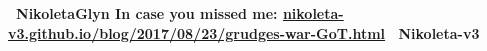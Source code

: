 \documentclass[usenames,dvipsnames,t]{beamer}
\begin{document}



\begin{columns}
    \begin{column}{.8\linewidth}
        \hspace{1cm}
     \textbf{ \faTwitter \ NikoletaGlyn \hspace{2cm} In case you missed me: \url{nikoleta-v3.github.io/blog/2017/08/23/grudges-war-GoT.html} \hspace{2cm} \faGithub \ Nikoleta-v3}
     \end{column}
\end{columns}
\end{document}
